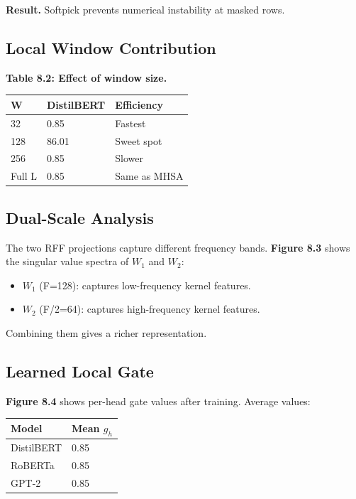 \textbf{Result.} Softpick prevents numerical instability at masked rows.

\subsection{Local Window Contribution}

\textbf{Table 8.2: Effect of window size.}

\begin{table}[H]
\centering
\small
\begin{tabular}{lll}
\toprule
\textbf{W} & \textbf{DistilBERT} & \textbf{Efficiency} \\
\midrule
32 & 0.85 & Fastest \\
128 & 86.01 & Sweet spot \\
256 & 0.85 & Slower \\
Full L & 0.85 & Same as MHSA \\
\bottomrule
\end{tabular}
\end{table}

\subsection{Dual-Scale Analysis}

The two RFF projections capture different frequency bands. \textbf{Figure 8.3} 
shows the singular value spectra of $W_1$ and $W_2$:

\begin{itemize}
\item $W_1$ (F=128): captures low-frequency kernel features.
\item $W_2$ (F/2=64): captures high-frequency kernel features.

\end{itemize}
Combining them gives a richer representation.

\subsection{Learned Local Gate}

\textbf{Figure 8.4} shows per-head gate values after training. Average values:

\begin{table}[H]
\centering
\small
\begin{tabular}{ll}
\toprule
\textbf{Model} & \textbf{Mean $g_h$} \\
\midrule
DistilBERT & 0.85 \\
RoBERTa & 0.85 \\
GPT-2 & 0.85 \\
\bottomrule
\end{tabular}
\end{table}

